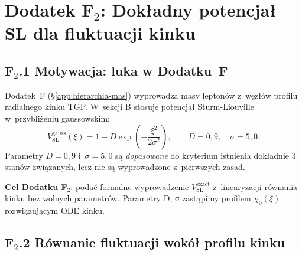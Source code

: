 %
%

\section*{Dodatek F$_2$: Dokładny potencjał SL dla fluktuacji kinku}
\label{app:wkb_exact}

\subsection*{F$_2$.1 Motywacja: luka w Dodatku~F}

Dodatek~F (§\ref{app:hierarchia-mas}) wyprowadza masy leptonów
z~węzłów profilu radialnego kinku TGP.
W~sekcji B stosuje potencjał Sturm-Liouville w~przybliżeniu
gaussowskim:
\begin{equation}
  V_\mathrm{SL}^\mathrm{gauss}(\xi)
  = 1 - D\exp\!\left(-\frac{\xi^2}{2\sigma^2}\right),
  \qquad D = 0{,}9,\quad \sigma = 5{,}0.
  \label{eq:V_gauss}
\end{equation}
Parametry $D = 0{,}9$ i~$\sigma = 5{,}0$ są \emph{dopasowane}
do kryterium istnienia dokładnie 3 stanów związanych, lecz
nie są wyprowadzone z~pierwszych zasad.

\textbf{Cel Dodatku F$_2$}: podać formalne wyprowadzenie
$V_\mathrm{SL}^\mathrm{exact}$ z~linearyzacji równania kinku
bez wolnych parametrów. Parametry D, σ zastąpimy profilem
$\chi_0(\xi)$ rozwiązującym ODE kinku.

\subsection*{F$_2$.2 Równanie fluktuacji wokół profilu kinku}


